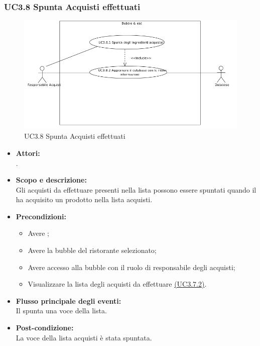 \subsubsection{UC3.8 Spunta Acquisti effettuati} \label{UC3.8}

\begin{figure}[H]
	\centering
	\includegraphics[width=15cm]{../../documenti/AnalisiDeiRequisiti/Diagrammi_img/uc3_8.png}
	\caption{UC3.8 Spunta Acquisti effettuati}
\end{figure}

\begin{itemize}
	\item \textbf{Attori:}
	\\.
	\item \textbf{Scopo e descrizione:} 
	\\Gli acquisti da effettuare presenti nella lista possono essere spuntati quando il  ha acquisito un prodotto nella lista acquisti.
	\item \textbf{Precondizioni:}
	\begin{itemize}
		\item Avere ;
		\item Avere la bubble del ristorante selezionato;
		\item Avere accesso alla bubble con il ruolo di responsabile degli acquisti;
		\item Visualizzare la lista degli acquisti da effettuare \hyperref[UC3.7.2]{(UC3.7.2)}.
	\end{itemize}
	\item \textbf{Flusso principale degli eventi:}
	\\Il {} spunta una voce della lista.
	\item \textbf{Post-condizione:}
	\\La voce della lista acquisti è stata spuntata.
\end{itemize}

